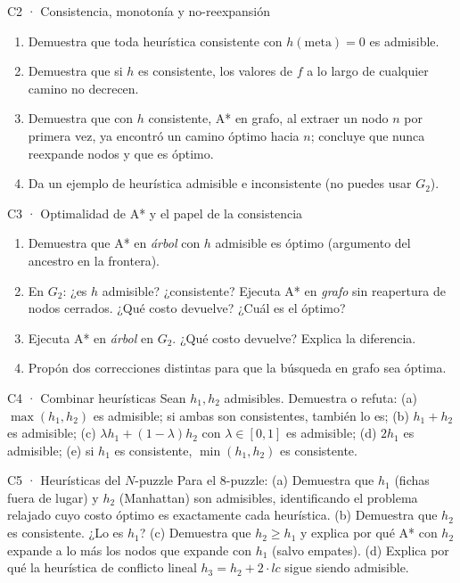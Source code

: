 \begin{ejercicio}{C2 · Consistencia, monotonía y no-reexpansión }
\begin{enumerate}[label=(\alph*)]
\item Demuestra que toda heurística consistente con $h(\text{meta})=0$ es admisible.
\item Demuestra que si $h$ es consistente, los valores de $f$ a lo largo de cualquier camino no decrecen.
\item Demuestra que con $h$ consistente, A* en grafo, al extraer un nodo $n$ por primera vez, ya
encontró un camino óptimo hacia $n$; concluye que nunca reexpande nodos y que es óptimo.
\item Da un ejemplo de heurística admisible e inconsistente (no puedes usar $G_2$).
\end{enumerate}
\end{ejercicio}

\begin{ejercicio}{C3 · Optimalidad de A* y el papel de la consistencia }
\begin{center}\figGDos\end{center}
\begin{enumerate}[label=(\alph*)]
\item Demuestra que A* en \emph{árbol} con $h$ admisible es óptimo (argumento del ancestro en la frontera).
\item En $G_2$: ¿es $h$ admisible? ¿consistente? Ejecuta A* en \emph{grafo} sin reapertura de
nodos cerrados. ¿Qué costo devuelve? ¿Cuál es el óptimo?
\item Ejecuta A* en \emph{árbol} en $G_2$. ¿Qué costo devuelve? Explica la diferencia.
\item Propón dos correcciones distintas para que la búsqueda en grafo sea óptima.
\end{enumerate}
\end{ejercicio}

\begin{ejercicio}{C4 · Combinar heurísticas }
Sean $h_1,h_2$ admisibles. Demuestra o refuta:
(a) $\max(h_1,h_2)$ es admisible; si ambas son consistentes, también lo es;
(b) $h_1+h_2$ es admisible;
(c) $\lambda h_1+(1-\lambda)h_2$ con $\lambda\in[0,1]$ es admisible;
(d) $2h_1$ es admisible;
(e) si $h_1$ es consistente, $\min(h_1,h_2)$ es consistente.
\end{ejercicio}

\begin{ejercicio}{C5 · Heurísticas del $N$-puzzle }
Para el 8-puzzle:
(a) Demuestra que $h_1$ (fichas fuera de lugar) y $h_2$ (Manhattan) son admisibles, identificando
el problema relajado cuyo costo óptimo es exactamente cada heurística.
(b) Demuestra que $h_2$ es consistente. ¿Lo es $h_1$?
(c) Demuestra que $h_2\ge h_1$ y explica por qué A* con $h_2$ expande a lo más los nodos que
expande con $h_1$ (salvo empates).
(d) Explica por qué la heurística de conflicto lineal $h_3=h_2+2\cdot lc$ sigue siendo admisible.
\end{ejercicio}

